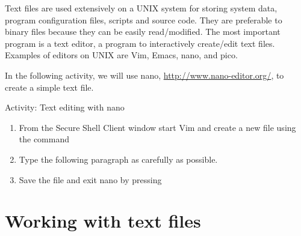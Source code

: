 Text files are used extensively on a UNIX system for storing system data,
program configuration files, scripts and source code. They are preferable to
binary files because they can be easily read/modified.  The most important
program is a text editor, a program to interactively create/edit text files.
Examples of editors on UNIX are Vim, Emacs, nano, and pico. 

\begin{frame}
\end{frame}


In the following activity, we will use nano, \url{http://www.nano-editor.org/}, to create a simple text file. 

\begin{frame}{Activity: Text editing with nano}
\begin{enumerate}
\item From the Secure Shell Client window start Vim and create a new file using
the command 
\item Type the following paragraph as carefully as possible.  
\item Save the file and exit nano by pressing 
\end{enumerate}
\end{frame}

\section{Working with text files} %


